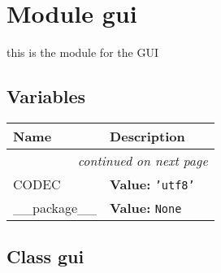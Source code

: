 %
%
%


\section{Module gui}

    \label{gui}
this is the module for the GUI



  \subsection{Variables}

    \vspace{-1cm}
\hspace{\varindent}\begin{longtable}{|p{\varnamewidth}|p{\vardescrwidth}|l}
\cline{1-2}
\cline{1-2} \centering \textbf{Name} & \centering \textbf{Description}& \\
\cline{1-2}
\endhead\cline{1-2}\multicolumn{3}{r}{\small\textit{continued on next page}}\\\endfoot\cline{1-2}
\endlastfoot\raggedright C\-O\-D\-E\-C\- & \raggedright \textbf{Value:} 
{\tt \texttt{'}\texttt{utf8}\texttt{'}}&\\
\cline{1-2}
\raggedright \_\-\_\-p\-a\-c\-k\-a\-g\-e\-\_\-\_\- & \raggedright \textbf{Value:} 
{\tt None}&\\
\cline{1-2}
\end{longtable}



\subsection{Class gui}

